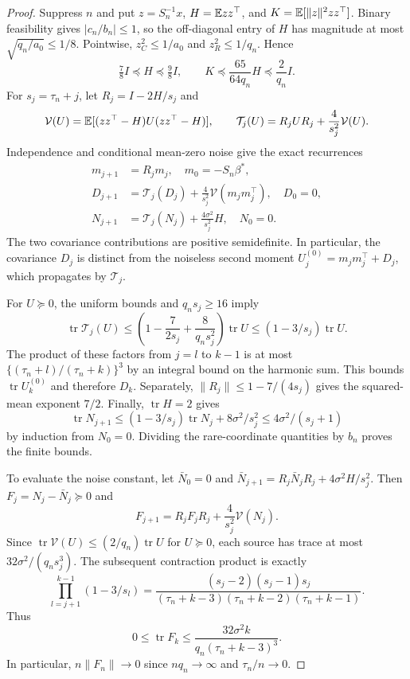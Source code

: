 \begin{proof}
 Suppress $n$ and put $z = S_n^{-1}x$, $H = \mathbb{E} zz^\top$, and
 $K = \mathbb{E}[\|z\|^2zz^\top]$. Binary feasibility gives $|c_n/b_n| \le 1$, so the
 off-diagonal entry of $H$ has magnitude at most $\sqrt{q_n/a_0} \le 1/8$.
 Pointwise, $z_C^2 \le 1/a_0$ and $z_R^2 \le 1/q_n$. Hence
 \[
  \tfrac78 I \preceq H
             \preceq \tfrac98 I,\qquad K
             \preceq \frac{65}{64q_n}H
             \preceq \frac2{q_n}I.
 \]
 For $s_j = \tau_n + j$, let $R_j = I - 2H/s_j$ and
 \[
  \mathcal V(U) = \mathbb{E}[(zz^\top-H)U(zz^\top-H)],\qquad \mathcal T_j(U)
                = R_jUR_j + \frac4{s_j^2}\mathcal V(U).
 \]
 Independence and conditional mean-zero noise give the exact recurrences
 \[
  \begin{split}
   m_{j+1} & = R_jm_j,\quad m_0 = -S_n\beta^*,                                          \\
   D_{j+1} & = \mathcal T_j(D_j) + \frac4{s_j^2}\mathcal V(m_jm_j^\top), \quad D_0 = 0, \\
   N_{j+1} & = \mathcal T_j(N_j) + \frac{4\sigma^2}{s_j^2}H,\quad N_0 = 0.
  \end{split}
 \]
 The two covariance contributions are positive semidefinite. In particular, the
 covariance $D_j$ is distinct from the noiseless second moment
 $U_j^{(0)} = m_jm_j^\top + D_j$, which propagates by $\mathcal T_j$.

 For $U \succeq 0$, the uniform bounds and $q_ns_j \ge 16$ imply
 \[
  \operatorname{tr}\mathcal T_j(U) \le \left( 1 - \frac7{2s_j} + \frac8{q_ns_j^2} \right)\operatorname{tr}U
                                   \le (1 - 3/s_j)\operatorname{tr}U.
 \]
 The product of these factors from $j = l$ to $k - 1$ is at most
 $\{(\tau_n + l)/(\tau_n + k)\}^3$ by an integral bound on the harmonic sum.
 This bounds $\operatorname{tr}U_k^{(0)}$ and therefore $D_k$. Separately,
 $\|R_j\| \le 1 - 7/(4s_j)$ gives the squared-mean exponent $7/2$. Finally,
 $\operatorname{tr}H = 2$ gives
 \[
  \operatorname{tr}N_{j+1} \le (1 - 3/s_j)\operatorname{tr}N_j + 8\sigma^2/s_j^2
                           \le 4\sigma^2/(s_j + 1)
 \]
 by induction from $N_0 = 0$. Dividing the rare-coordinate quantities by $b_n$
 proves the finite bounds.

 To evaluate the noise constant, let $\bar N_0 = 0$ and
 $\bar N_{j+1} = R_j\bar N_jR_j + 4\sigma^2H/s_j^2$. Then
 $F_j = N_j - \bar N_j \succeq 0$ and
 \[
  F_{j+1} = R_jF_jR_j + \frac4{s_j^2}\mathcal V(N_j).
 \]
 Since $\operatorname{tr}\mathcal V(U) \le (2/q_n)\operatorname{tr}U$ for
 $U \succeq 0$, each source has trace at most $32\sigma^2/(q_ns_j^3)$. The
 subsequent contraction product is exactly
 \[
  \prod_{l=j+1}^{k-1}(1 - 3/s_l) = \frac{(s_j - 2)(s_j - 1)s_j}
 {(\tau_n + k - 3)(\tau_n + k - 2)(\tau_n + k - 1)}.
 \]
 Thus
 \begin{equation}
  \label{eq:budget-amplification}
  0 \le \operatorname{tr}F_k \le \frac{32\sigma^2 k}{q_n(\tau_n + k - 3)^3}.
 \end{equation}
 In particular, $n\|F_n\| \to 0$ since $nq_n \to \infty$ and $\tau_n/n \to 0$.


\end{proof}
